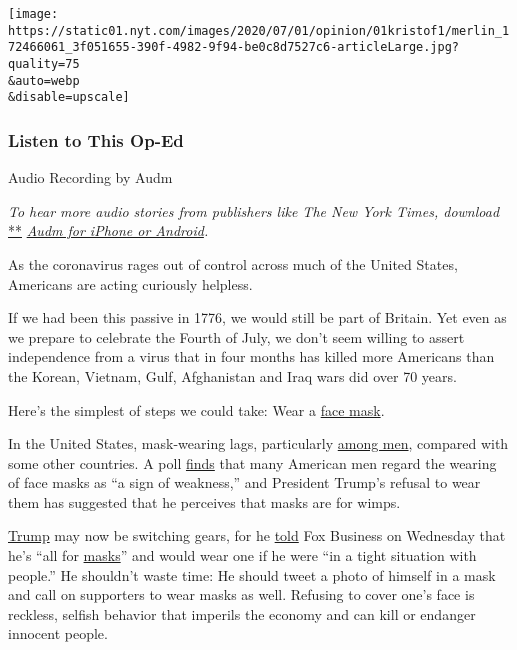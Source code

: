 \texttt{[image: https://static01.nyt.com/images/2020/07/01/opinion/01kristof1/merlin\_172466061\_3f051655-390f-4982-9f94-be0c8d7527c6-articleLarge.jpg?quality=75\\\&auto=webp\\\&disable=upscale]}

\hypertarget{listen-to-this-op-ed}{%
\subsubsection{Listen to This Op-Ed}\label{listen-to-this-op-ed}}

Audio Recording by Audm

\emph{To hear more audio stories from publishers like The New York
Times, download}
\href{https://www.audm.com/?utm_source=nytmag\&utm_medium=embed\&utm_campaign=left_behind_draper}{**}
\href{https://www.audm.com/?utm_source=nytopinion\&utm_medium=embed\&utm_campaign=refusing_mask_drunk}{\emph{Audm
for iPhone or Android}}\emph{.}

As the coronavirus rages out of control across much of the United
States, Americans are acting curiously helpless.

If we had been this passive in 1776, we would still be part of Britain.
Yet even as we prepare to celebrate the Fourth of July, we don't seem
willing to assert independence from a virus that in four months has
killed more Americans than the Korean, Vietnam, Gulf, Afghanistan and
Iraq wars did over 70 years.

Here's the simplest of steps we could take: Wear a
\href{https://www.nytimes.com/article/which-stores-require-masks.html}{face
mask}.

In the United States, mask-wearing lags, particularly
\href{https://www.nytimes.com/2020/06/02/health/coronavirus-face-masks-surveys.html}{among
men}, compared with some other countries. A poll
\href{https://psyarxiv.com/tg7vz}{finds} that many American men regard
the wearing of face masks as ``a sign of weakness,'' and President
Trump's refusal to wear them has suggested that he perceives that masks
are for wimps.

\href{https://www.nytimes.com/2020/07/12/world/coronavirus-live-updates.html}{Trump}
may now be switching gears, for he
\href{https://www.forbes.com/sites/jackbrewster/2020/07/01/im-all-for-masks-trump-says-in-change-of-tune/\#2751da3c2122}{told}
Fox Business on Wednesday that he's ``all for
\href{https://www.nytimes.com/article/which-stores-require-masks.html}{masks}''
and would wear one if he were ``in a tight situation with people.'' He
shouldn't waste time: He should tweet a photo of himself in a mask and
call on supporters to wear masks as well. Refusing to cover one's face
is reckless, selfish behavior that imperils the economy and can kill or
endanger innocent people.

